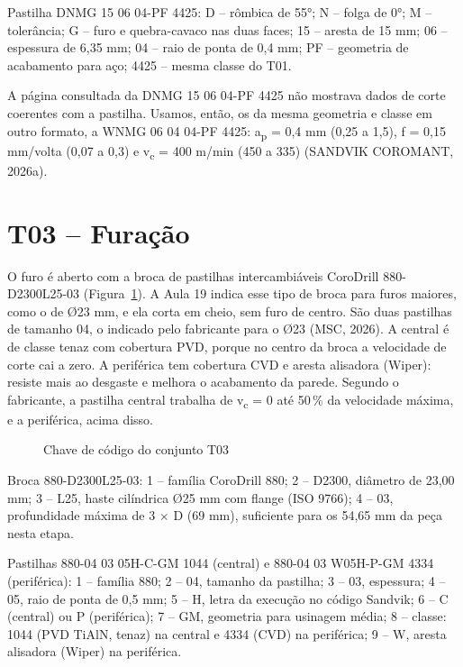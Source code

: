 \noindent Pastilha DNMG 15 06 04-PF 4425: D – rômbica de 55°; N – folga de 0°; M – tolerância; G – furo e quebra-cavaco nas duas faces; 15 – aresta de 15 mm; 06 – espessura de 6,35 mm; 04 – raio de ponta de 0,4 mm; PF – geometria de acabamento para aço; 4425 – mesma classe do T01.

A página consultada da DNMG 15 06 04-PF 4425 não mostrava dados de corte coerentes com a pastilha. Usamos, então, os da mesma geometria e classe em outro formato, a WNMG 06 04 04-PF 4425: a\textsubscript{p} = 0,4 mm (0,25 a 1,5), f = 0,15 mm/volta (0,07 a 0,3) e v\textsubscript{c} = 400 m/min (450 a 335) (SANDVIK COROMANT, 2026a).

\section{T03 – Furação}

O furo é aberto com a broca de pastilhas intercambiáveis CoroDrill 880-D2300L25-03 (Figura~\ref{fig:chaveT03}). A Aula 19 indica esse tipo de broca para furos maiores, como o de Ø23 mm, e ela corta em cheio, sem furo de centro. São duas pastilhas de tamanho 04, o indicado pelo fabricante para o Ø23 (MSC, 2026). A central é de classe tenaz com cobertura PVD, porque no centro da broca a velocidade de corte cai a zero. A periférica tem cobertura CVD e aresta alisadora (Wiper): resiste mais ao desgaste e melhora o acabamento da parede. Segundo o fabricante, a pastilha central trabalha de v\textsubscript{c} = 0 até 50\,\% da velocidade máxima, e a periférica, acima disso.

\begin{figure}[H]
\centering
\caption{Chave de código do conjunto T03}\label{fig:chaveT03}
\par\medskip
{}\qquad
{}
\end{figure}

\noindent Broca 880-D2300L25-03: 1 – família CoroDrill 880; 2 – D2300, diâmetro de 23,00 mm; 3 – L25, haste cilíndrica Ø25 mm com flange (ISO 9766); 4 – 03, profundidade máxima de 3 $\times$ D (69 mm), suficiente para os 54,65 mm da peça nesta etapa.

\noindent Pastilhas 880-04 03 05H-C-GM 1044 (central) e 880-04 03 W05H-P-GM 4334 (periférica): 1 – família 880; 2 – 04, tamanho da pastilha; 3 – 03, espessura; 4 – 05, raio de ponta de 0,5 mm; 5 – H, letra da execução no código Sandvik; 6 – C (central) ou P (periférica); 7 – GM, geometria para usinagem média; 8 – classe: 1044 (PVD TiAlN, tenaz) na central e 4334 (CVD) na periférica; 9 – W, aresta alisadora (Wiper) na periférica.


